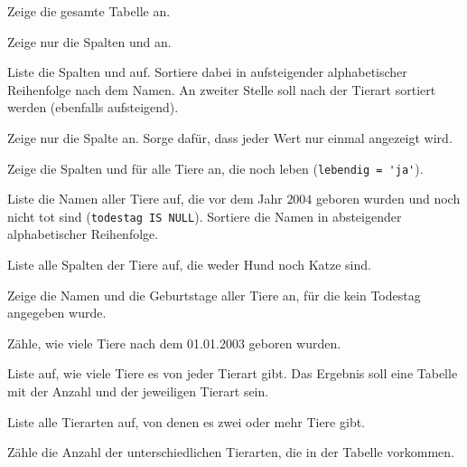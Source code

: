 \begin{compactenum}[a)]
\item Zeige die gesamte Tabelle  an.
\item Zeige nur die Spalten  und  an.
\item Liste die Spalten  und  auf.
Sortiere dabei in aufsteigender alphabetischer Reihenfolge nach dem Namen. An
zweiter Stelle soll nach der Tierart sortiert werden (ebenfalls aufsteigend).
\item Zeige nur die Spalte  an. Sorge dafür, dass jeder
Wert nur einmal angezeigt wird.
\item Zeige die Spalten  und  für alle
Tiere an, die noch leben (\lstinline|lebendig = 'ja'|).
\item Liste die Namen aller Tiere auf, die vor dem Jahr $2004$ geboren wurden
und noch nicht tot sind (\lstinline|todestag IS NULL|). Sortiere die Namen in
absteigender alphabetischer Reihenfolge.
\item Liste alle Spalten der Tiere auf, die weder Hund noch Katze sind.
\item Zeige die Namen und die Geburtstage aller Tiere an, für die kein
Todestag angegeben wurde.
\item Zähle, wie viele Tiere nach dem 01.01.2003 geboren wurden.
\item Liste auf, wie viele Tiere es von jeder Tierart gibt. Das Ergebnis soll
eine Tabelle mit der Anzahl und der jeweiligen Tierart sein.
\item Liste alle Tierarten auf, von denen es zwei oder mehr Tiere gibt.
\item Zähle die Anzahl der unterschiedlichen Tierarten, die in der Tabelle
vorkommen.
\end{compactenum}

